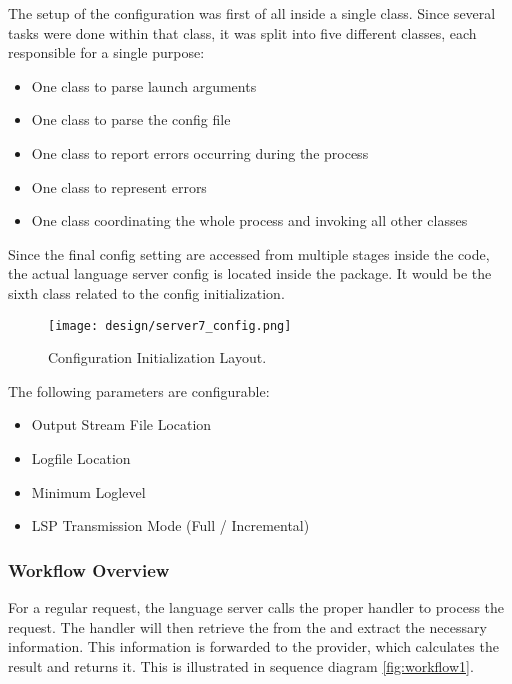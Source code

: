 The setup of the configuration was first of all inside a single class.
Since several tasks were done within that class, it was split into five different classes, each responsible for a single purpose:
\begin{itemize}
    \item One class to parse launch arguments
    \item One class to parse the config file
    \item One class to report errors occurring during the process
    \item One class to represent errors
    \item One class coordinating the whole process and invoking all other classes
\end{itemize}
Since the final config setting are accessed from multiple stages inside the code, the actual language server config is located inside the  package.
It would be the sixth class related to the config initialization.

\begin{figure}[h]
    \centering
    \texttt{[image: design/server7\_config.png]}
    \caption{Configuration Initialization Layout.}
    \label{fig:server_config}
\end{figure}

The following parameters are configurable:
\begin{itemize}
    \item Output Stream File Location
    \item Logfile Location
    \item Minimum Loglevel
    \item LSP Transmission Mode (Full / Incremental)
\end{itemize}


\subsubsection{Workflow Overview}
For a regular request, the language server calls the proper handler to process the request.
The handler will then retrieve the  from the  and extract the necessary information.
This information is forwarded to the provider, which calculates the result and returns it.
This is illustrated in sequence diagram \ref{fig:workflow1}.

